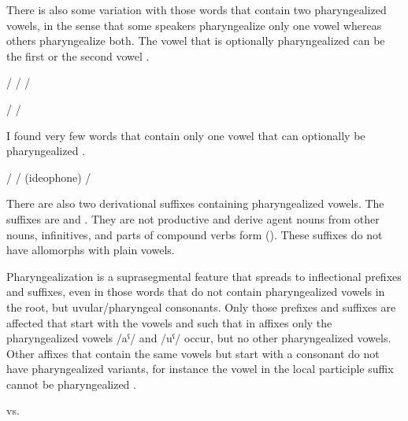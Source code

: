 There is also some variation with those words that contain two pharyngealized vowels, in the sense that some speakers pharyngealize only one vowel whereas others pharyngealize both. The vowel that is optionally pharyngealized can be the first  or the second vowel .
%
\begin{exe}
	\label{ex:pharyngealization of first vowel or both vowels}
	\begin{xlist}
		\ex	{}\slash{} 
		\ex	{}\slash{} 
		\ex	{}\slash{} 
	\end{xlist}

	\label{ex:pharyngealization of second vowel or both vowels}
	\begin{xlist}
		\ex	{}\slash{} \sqt{secret, secretly}
		\ex	{}\slash{} \sqt{boy, son}
	\end{xlist}
\end{exe}

I found very few words that contain only one vowel that can optionally be pharyngealized .
%
\begin{exe}
	\ex	\label{ex:optional pharyngealization vowels phon}
	\begin{xlist}
		\ex	{}\slash{} \sqt{snow}
		\ex	{}\slash{}  (ideophone)
		\ex	{}\slash{} \sqt{wine}
	\end{xlist}
\end{exe}

There are also two derivational suffixes containing pharyngealized vowels. The suffixes are  and . They are not productive and derive agent nouns from other nouns, infinitives, and parts of compound verbs form (). These suffixes do not have allomorphs with plain vowels.

Pharyngealization is a suprasegmental feature that spreads to inflectional prefixes and suffixes, even in those words that do not contain pharyngealized vowels in the root, but uvular/pharyngeal consonants. Only those prefixes and suffixes are affected that start with the vowels  and  such that in affixes only the pharyngealized vowels /aˁ/ and /uˁ/ occur, but no other pharyngealized vowels. Other affixes that contain the same vowels but start with a consonant do not have pharyngealized variants, for instance the vowel in the local participle suffix  cannot be pharyngealized . 
%
\begin{exe}
	\ex	\label{ex:pharyngealization na phon}
\TabPositions{12em}
	  \tab vs.  
\end{exe}

